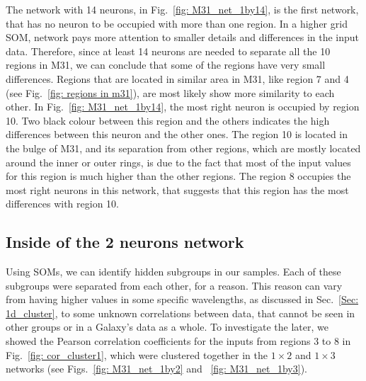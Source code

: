         The network with 14 neurons, in Fig.~\ref{fig: M31_net_1by14}, is the first network, that has no neuron to be occupied with more than one region.
        In a higher grid SOM, network pays more attention to smaller details and differences in the input data.
        Therefore, since at least 14 neurons are needed to separate all the 10 regions in M31, we can conclude that some of the regions have very small differences.
        Regions that are located in similar area in M31, like region 7 and 4 (see Fig.~\ref{fig: regions in m31}), are most likely show more similarity to each other.
        In Fig.~\ref{fig: M31_net_1by14}, the most right neuron is occupied by region 10.
        Two black colour between this region and the others indicates the high differences between this neuron and the other ones.
        The region 10 is located in the bulge of M31, and its separation from other regions, which are mostly located around the inner or outer rings, is due to the fact that most of the input values for this region is much higher than the other regions.
        The region 8 occupies the most right neurons in this network, that suggests that this region has the most differences with region 10.
        
        
    \subsection{Inside of the 2 neurons network}%
        \label{sec: inside_the_2_neurons}
        Using SOMs, we can identify hidden subgroups in our samples. 
        Each of these subgroups were separated from each other, for a reason.
        This reason can vary from having higher values in some specific wavelengths, as discussed in Sec.~\ref{Sec: 1d_cluster}, to some unknown correlations between data, that cannot be seen in other groups or in a Galaxy's data as a whole.
        To investigate the later, we showed the Pearson correlation coefficients for the inputs from regions 3 to 8 in Fig.~\ref{fig: cor_cluster1}, which were clustered together in the $1\times2$ and $1\times3$ networks (see Figs.~\ref{fig: M31_net_1by2} and ~\ref{fig: M31_net_1by3}).
        
